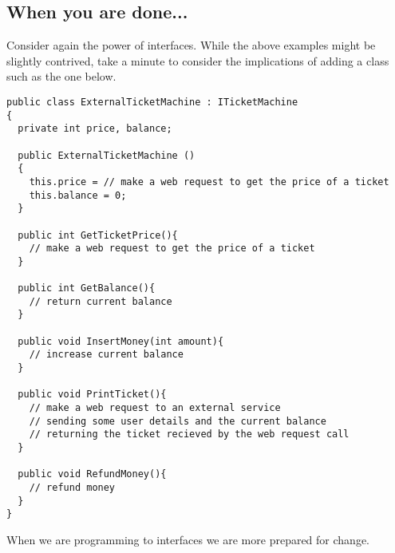 \documentclass{article}
\begin{document}
\subsection{When you are done...}
Consider again the power of interfaces. While the above examples might be slightly contrived, take a minute to consider the implications of adding a class such as the one below.
\begin{lstlisting}
public class ExternalTicketMachine : ITicketMachine
{ 
  private int price, balance;

  public ExternalTicketMachine ()
  {
    this.price = // make a web request to get the price of a ticket
    this.balance = 0;
  }

  public int GetTicketPrice(){
    // make a web request to get the price of a ticket
  }

  public int GetBalance(){
    // return current balance
  }

  public void InsertMoney(int amount){
    // increase current balance
  }

  public void PrintTicket(){
    // make a web request to an external service
    // sending some user details and the current balance
    // returning the ticket recieved by the web request call
  }

  public void RefundMoney(){
    // refund money
  }
}
\end{lstlisting}
When we are programming to interfaces we are more prepared for change.














\pagebreak
\end{document}
